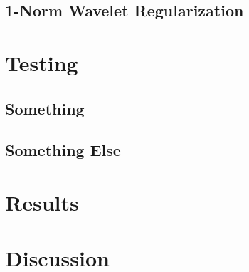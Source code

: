 \documentclass[10pt,a4paper]{article}
\begin{document}
\subsection{1-Norm Wavelet Regularization}

\section{Testing}

\subsection{Something}


\subsection{Something Else}



\section{Results}

\section{Discussion}



\end{document}
